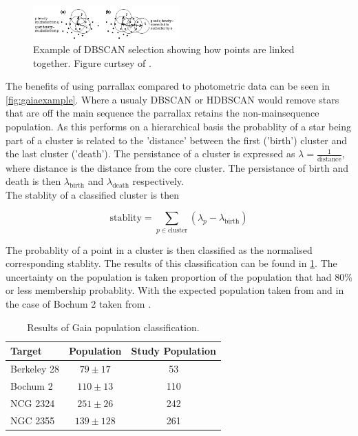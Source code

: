 \begin{figure}[h!]
  \centering
  \includegraphics[width = 0.5\textwidth]{figures/dbscan_ester_1996.png}
  \caption{Example of DBSCAN selection showing how points are linked together. Figure curtsey of \cite{Ester96adensity-based}.}
  \label{fig:DBScan_example}
\end{figure}

The benefits of using parrallax compared to photometric data can be seen in \cref{fig:gaiaexample}. Where a usualy DBSCAN or HDBSCAN would remove stars that are off the main sequence the parrallax retains the non-mainsequence population. As this performs on a hierarchical basis the probablity of a star being part of a cluster is related to the 'distance' between the first ('birth') cluster and the last cluster ('death'). The persistance of a cluster is expressed as $\lambda = \frac{1}{\text{distance}}$, where distance is the distance from the core cluster. The persistance of birth and death is then $\lambda_{\text{birth}}$ and $\lambda_{\text{death}}$ respectively. \\ The stablity of a classified cluster is then 

\begin{equation}
  \text{stablity} = \sum_{p \in \text{cluster}} (\lambda_p  - \lambda_{\text{birth}})
\end{equation}

The probablity of a point in a cluster is then classified as the normalised corresponding stablity. The results of this classification can be found in \cref{tb: population_classification}. The uncertainty on the population is taken proportion of the population that had 80\% or less membership probablity. With the expected population taken from \cite{2020A&A...640A...1C} and in the case of Bochum 2 taken from \cite{1993Turbide}. 

\begin{table}[h!]
  \caption{Results of Gaia population classification.}
  \label{tb: population_classification}
  \begin{tabular}{lcc} \hline \hline 
    Target & Population & Study Population \\ \hline 
    Berkeley 28 & $79 \pm 17$ & 53\\ 
    Bochum 2 & $110 \pm 13 $ & 110 \\ 
    NCG 2324 & $251 \pm 26 $ & 242 \\
    NGC 2355 & $139 \pm 128$ & 261 \\ \hline 
  \end{tabular}
\end{table}


